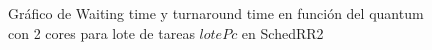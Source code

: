 \begin{figure}[H]
\hfill
{}
\hfill
{}
\hfill
\caption{Gráfico de Waiting time y turnaround time en función del quantum con 2 cores para lote de tareas $lotePc$ en SchedRR2}
\end{figure}

